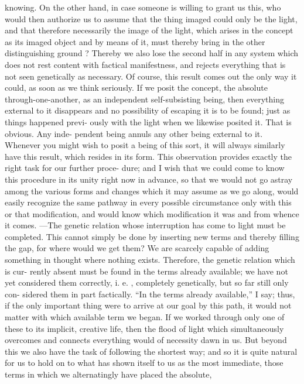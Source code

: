 knowing.
 On the other hand, in case someone is willing to grant
us this, who would then authorize us to assume that the thing imaged could
only be the light, and that therefore necessarily the image of the light, which
arises in the concept as its imaged object and by means of it, must thereby
bring in the other distinguishing ground ? Thereby we also lose the second half
in any system which does not rest content with factical manifestness, and
rejects everything that is not seen genetically as necessary.
Of course, this result comes out the only way it could, as soon as we
think seriously.
 If we posit the concept, the absolute through-one-another, as an
independent self-subsisting being, then everything external to it disappears
and no possibility of escaping it is to be found; just as things happened previ-
ously with the light when we likewise posited it.
 That is obvious.
 Any inde-
pendent being annuls any other being external to it.
 Whenever you might
wish to posit a being of this sort, it will always similarly have this result, which
resides in its form.
This observation provides exactly the right task for our further proce-
dure; and I wish that we could come to know this procedure in its unity right
now in advance, so that we would not go astray among the various forms and
changes which it may assume as we go along, would easily recognize the same
pathway in every possible circumstance only with this or that modification,
and would know which modification it was and from whence it comes.
—The
genetic relation whose interruption has come to light must be completed.
 This
cannot simply be done by inserting new terms and thereby filling the gap, for
where would we get them? We are scarcely capable of adding something in
thought where nothing exists.
 Therefore, the genetic relation which is cur-
rently absent must be found in the terms already available; we have not yet
considered them correctly, i.
e.
, completely genetically, but so far still only con-
sidered them in part factically.
 “In the terms already available,” I say; thus, if
the only important thing were to arrive at our goal by this path, it would not
matter with which available term we began.
 If we worked through only one of
these to its implicit, creative life, then the flood of light which simultaneously
overcomes and connects everything would of necessity dawn in us.
 But
beyond this we also have the task of following the shortest way; and so it is
quite natural for us to hold on to what has shown itself to us as the most
immediate, those terms in which we alternatingly have placed the absolute,
